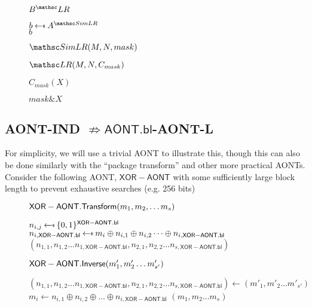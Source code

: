 \documentclass[11pt,twoside]{article}
\begin{document}
\begin{figure}[H]
{
\underline{$\advB^\LRO$}

\begin{algorithm}[H]
$b\getsr \advA^{\procfont{SimLR}}$\\
\Return $b$
\end{algorithm}

\underline{$\procfont{SimLR}(M,N,mask)$}

\begin{algorithm}[H]
\Return $\LRO(M,N,C_{mask})$
\end{algorithm}

\underline{$C_{mask}(X)$}

\begin{algorithm}[H]
\Return $mask \mathrel{\&} X$
\end{algorithm}
}
\end{figure}

\subsection{AONT-IND $\not\Rightarrow \mathsf{AONT.bl}$-AONT-L}

For simplicity, we will use a trivial AONT to illustrate this, though this can also be done similarly with the ``package transform'' and other more practical AONTs. Consider the following AONT, $\mathsf{XOR-AONT}$ with some sufficiently large block length to prevent exhaustive searches (e.g. 256 bits)

\begin{figure}[h]
{
\underline{$\mathsf{XOR-AONT.Transform}(m_1,m_2,\dots m_s)$}

\begin{algorithm}[H]
{
{
$n_{i,j}\getsr\bits^{\mathsf{XOR-AONT.bl}}$
}
$n_{i,\mathsf{XOR-AONT.bl}}\getsr m_i \oplus n_{i,1} \oplus n_{i,2} \dots \oplus n_{i,\mathsf{XOR-AONT.bl}}$
}
\Return $(n_{1,1},n_{1,2}\dots n_{1,\mathsf{XOR-AONT.bl}},n_{2,1},n_{2,2}\dots n_{s,\mathsf{XOR-AONT.bl}})$
\end{algorithm}

\underline{$\mathsf{XOR-AONT.Inverse}(m'_1,m'_2\dots m'_{s'})$}

\begin{algorithm}[H]
$(n_{1,1},n_{1,2}\dots n_{1,\mathsf{XOR-AONT.bl}},n_{2,1},n_{2,2}\dots n_{s,\mathsf{XOR-AONT.bl}})\gets (m'_1,m'_2\dots m'_{s'})$\\
{
$m_i\gets n_{i,1}\oplus n_{i,2}\oplus \dots \oplus n_{i,\mathsf{XOR-AONT.bl}}$
}
\Return $(m_1,m_2\dots m_s)$
\end{algorithm}
}
\end{figure} 
\end{document}
